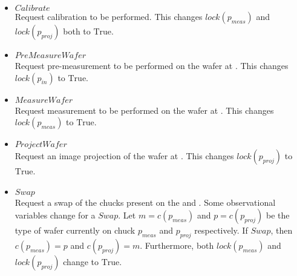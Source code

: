 \begin{itemize}
    \item $\mathit{Calibrate}$ \\
    Request calibration to be performed.
    This changes $\mathit{lock}(p_\mathit{meas})$ and $\mathit{lock}(p_\mathit{proj})$ both to $\text{True}$.

    \item $\mathit{PreMeasureWafer}$ \\
    Request pre-measurement to be performed on the wafer at \chuckIn.
    This changes $\mathit{lock}(p_\mathit{in})$ to $\text{True}$.

    \item $\mathit{MeasureWafer}$ \\
    Request measurement to be performed on the wafer at \chuckMeas.
    This changes $\mathit{lock}(p_\mathit{meas})$ to $\text{True}$.

    \item $\mathit{ProjectWafer}$ \\
    Request an image projection of the wafer at \chuckProj.
    This changes $\mathit{lock}(p_\mathit{proj})$ to $\text{True}$.

    \item $\mathit{Swap}$ \\
    Request a swap of the chucks present on the \chuckMeas and \chuckProj.
    Some observational variables change for a $\mathit{Swap}$.
    Let $m = c\left(p_\mathit{meas}\right)$ and $p = c\left(p_\mathit{proj}\right)$ be the type of wafer currently on chuck $p_\mathit{meas}$ and $p_\mathit{proj}$ respectively.
    If $\mathit{Swap}$, then $c\left(p_\mathit{meas}\right) = p$ and $c\left(p_\mathit{proj}\right) = m$.
    Furthermore, both $\mathit{lock}(p_\mathit{meas})$ and $\mathit{lock}(p_\mathit{proj})$ change to $\text{True}$.
\end{itemize}

